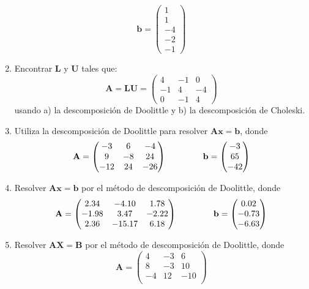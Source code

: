 \begin{enumerate}
\[	\mathbf{b} =	
	\begin{pmatrix}
		1 \\
		1 \\
		-4 \\
		-2 \\
		-1
	\end{pmatrix} \]
\item Encontrar $\mathbf{L}$ y $\mathbf{U}$ tales que:
\[ \mathbf{A} = \mathbf{LU} =
	\begin{pmatrix}
		4 & -1 & 0 \\
		-1 & 4 & -4 \\
		0 & -1 & 4
	\end{pmatrix} \]
	usando a) la descomposición de Doolittle y b) la descomposición de Choleski.
\item Utiliza la descomposición de Doolittle para resolver $\mathbf{Ax}=\mathbf{b}$, donde
\[  \mathbf{A} =
	\begin{pmatrix}
		-3 & 6 & -4 \\
		9 & -8 & 24 \\
		-12 & 24 & -26 \\
	\end{pmatrix} \hspace{1.5cm}
	\mathbf{b} =	
	\begin{pmatrix}
		-3 \\
		65 \\
		-42
	\end{pmatrix} \]
\item Resolver $\mathbf{Ax} = \mathbf{b}$ por el método de descomposición de Doolittle, donde
\[  \mathbf{A} =
	\begin{pmatrix}
		2.34 & -4.10 & 1.78 \\
		-1.98 & 3.47 & -2.22 \\
		2.36 & -15.17 & 6.18 \\
	\end{pmatrix} \hspace{1.5cm}
	\mathbf{b} =	
	\begin{pmatrix}
		0.02 \\
		-0.73 \\
		-6.63
	\end{pmatrix} \]
\item Resolver $\mathbf{AX} = \mathbf{B}$ por el método de descomposición de Doolittle, donde
\[  \mathbf{A} =
	\begin{pmatrix}
		4 & -3 & 6 \\
		8 & -3 & 10 \\
		-4 & 12 & -10 \\

\end{pmatrix}\]
\end{enumerate}
